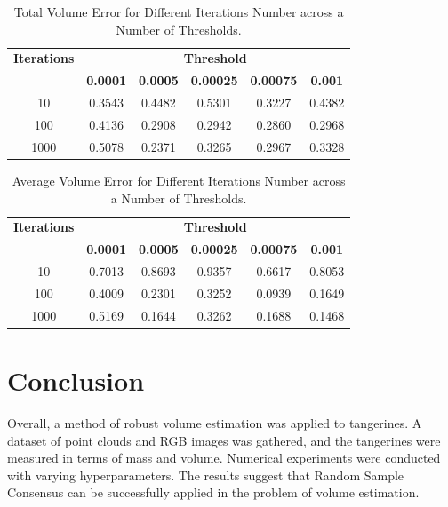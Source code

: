 \begin{table}[htbp]
\caption{Total Volume Error for Different Iterations Number across a Number of Thresholds.}
\tablesize
\begin{tabular}{|c|c|c|c|c|c|}
\hline
\multicolumn{1}{|c|}{\tableheadsize\textbf{Iterations}} & \multicolumn{5}{c|}{\tableheadsize\textbf{Threshold}} \\
\cline{2-6} 
 & \tablesubheadsize\textbf{0.0001} & \tablesubheadsize\textbf{0.0005} & \tablesubheadsize\textbf{0.00025} & \tablesubheadsize\textbf{0.00075} & \tablesubheadsize\textbf{0.001} \\
\hline
10 & 0.3543 & 0.4482 & 0.5301 & 0.3227 & 0.4382 \\
100 & 0.4136 & 0.2908 & 0.2942 & 0.2860 & 0.2968 \\
1000 & 0.5078 & 0.2371 & 0.3265 & 0.2967 & 0.3328 \\
\hline
\end{tabular}
\label{tab1}
\end{table}

\begin{table}[htbp]
\caption{Average Volume Error for Different Iterations Number across a Number of Thresholds.}
\tablesize
\begin{tabular}{|c|c|c|c|c|c|}
\hline
\multicolumn{1}{|c|}{\tableheadsize\textbf{Iterations}} & \multicolumn{5}{c|}{\tableheadsize\textbf{Threshold}} \\
\cline{2-6} 
 & \tablesubheadsize\textbf{0.0001} & \tablesubheadsize\textbf{0.0005} & \tablesubheadsize\textbf{0.00025} & \tablesubheadsize\textbf{0.00075} & \tablesubheadsize\textbf{0.001} \\
\hline
10 & 0.7013 & 0.8693 & 0.9357 & 0.6617 & 0.8053 \\
100 & 0.4009 & 0.2301 & 0.3252 & 0.0939 & 0.1649 \\
1000 & 0.5169 & 0.1644 & 0.3262 & 0.1688 & 0.1468 \\
\hline
\end{tabular}
\label{tab2}
\end{table}

\section{Conclusion}

Overall, a method of robust volume estimation was applied to tangerines.
A dataset of point clouds and RGB images was gathered, and the tangerines were measured in terms of mass and volume.
Numerical experiments were conducted with varying hyperparameters.
The results suggest that Random Sample Consensus can be successfully applied in the problem of volume estimation.

